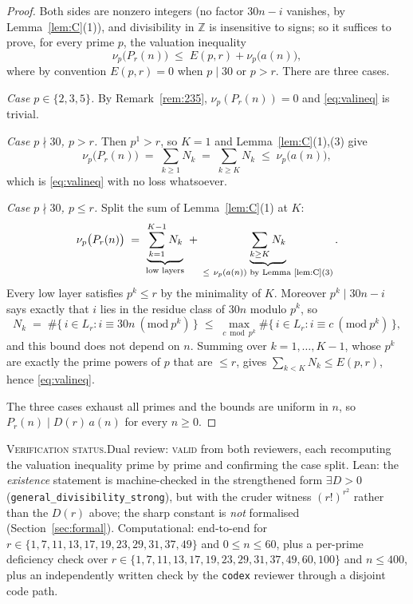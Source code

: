 \documentclass[11pt]{article}
\theoremstyle{plain}
\theoremstyle{definition}
\theoremstyle{remark}
\numberwithin{equation}{section}
\newcommand{\Z}{\mathbb{Z}}
\newcommand{\Lr}{L_r}
\newcommand{\vstatus}[1]{%
  \par\vspace{3pt}\noindent
  {\small\textsc{Verification status.}\enspace #1}\par\vspace{3pt}}
\begin{document}
\begin{proof}
Both sides are nonzero integers (no factor $30n-i$ vanishes, by Lemma~\ref{lem:C}(1)), and
divisibility in $\Z$ is insensitive to signs; so it suffices to prove, for every prime $p$, the
valuation inequality
\begin{equation}
  \nu_p\bigl(P_r(n)\bigr) \;\le\; E(p,r) + \nu_p\bigl(a(n)\bigr),
  \label{eq:valineq}
\end{equation}
where by convention $E(p,r) = 0$ when $p \mid 30$ or $p > r$. There are three cases.

\emph{Case $p \in \{2,3,5\}$.} By Remark~\ref{rem:235}, $\nu_p(P_r(n)) = 0$ and
\eqref{eq:valineq} is trivial.

\emph{Case $p \nmid 30$, $p > r$.} Then $p^1 > r$, so $K = 1$ and Lemma~\ref{lem:C}(1),(3) give
\[
  \nu_p\bigl(P_r(n)\bigr) \;=\; \sum_{k \ge 1} N_k \;=\; \sum_{k \ge K} N_k
  \;\le\; \nu_p\bigl(a(n)\bigr),
\]
which is \eqref{eq:valineq} with no loss whatsoever.

\emph{Case $p \nmid 30$, $p \le r$.} Split the sum of Lemma~\ref{lem:C}(1) at $K$:
\[
  \nu_p\bigl(P_r(n)\bigr)
  \;=\; \underbrace{\sum_{k=1}^{K-1} N_k}_{\text{low layers}}
  \;+\; \underbrace{\sum_{k \ge K} N_k}_{\le\ \nu_p(a(n)) \text{ by Lemma~\ref{lem:C}(3)}} .
\]
Every low layer satisfies $p^k \le r$ by the minimality of $K$. Moreover $p^k \mid 30n - i$ says
exactly that $i$ lies in the residue class of $30n$ modulo $p^k$, so
\[
  N_k \;=\; \#\{\, i \in \Lr : i \equiv 30n \ (\mathrm{mod}\ p^k)\,\}
  \;\le\; \max_{c \bmod p^k} \#\{\, i \in \Lr : i \equiv c \ (\mathrm{mod}\ p^k)\,\} ,
\]
and this bound does not depend on $n$. Summing over $k = 1,\dots,K-1$, whose $p^k$ are exactly
the prime powers of $p$ that are $\le r$, gives $\sum_{k<K} N_k \le E(p,r)$, hence
\eqref{eq:valineq}.

The three cases exhaust all primes and the bounds are uniform in $n$, so
$P_r(n) \mid D(r)\,a(n)$ for every $n \ge 0$.
\end{proof}
\vstatus{Dual review: \textsc{valid} from both reviewers, each recomputing the valuation
inequality prime by prime and confirming the case split. Lean: the \emph{existence} statement is
machine-checked in the strengthened form $\exists D > 0$ (\texttt{general\_divisibility\_strong}),
but with the cruder witness $(r!)^{r^2}$ rather than the $D(r)$ above; the sharp constant is
\emph{not} formalised (Section~\ref{sec:formal}). Computational: end-to-end for
$r \in \{1,7,11,13,17,19,23,29,31,37,49\}$ and $0 \le n \le 60$, plus a per-prime deficiency
check over $r \in \{1,7,11,13,17,19,23,29,31,37,49,60,100\}$ and $n \le 400$, plus an
independently written check by the
\texttt{codex} reviewer through a disjoint code path.}
\end{document}
